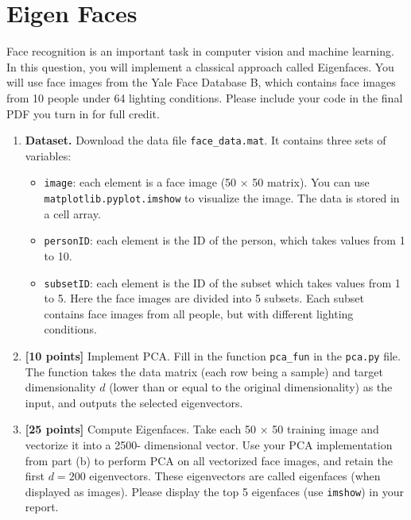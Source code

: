 \documentclass[a3paper,12pt]{extarticle} %
\begin{document}
\newpage
\section{Eigen Faces}
Face recognition is an important task in computer vision and machine learning. In this question, you will
implement a classical approach called Eigenfaces. You will use face images from the Yale Face Database
B, which contains face images from 10 people under 64 lighting conditions. Please include your code in
the final PDF you turn in for full credit.

\begin{enumerate}
    \item \textbf{Dataset.} Download the data file \texttt{face\_data.mat}. It contains three sets of variables:
    \begin{itemize}
        \item \texttt{image}: each element is a face image (50 × 50 matrix). You can use \texttt{matplotlib.pyplot.imshow}
        to visualize the image. The data is stored in a cell array.
        \item \texttt{personID}: each element is the ID of the person, which takes values from 1 to 10.
        \item \texttt{subsetID}: each element is the ID of the subset which takes values from 1 to 5. Here the face
        images are divided into 5 subsets. Each subset contains face images from all people, but with
        different lighting conditions.
    \end{itemize}
    
    \item \textbf{[10 points]} Implement PCA. Fill in the function \texttt{pca\_fun} in the \texttt{pca.py} file. The function takes the
    data matrix (each row being a sample) and target dimensionality $d$ (lower than or equal to the original
    dimensionality) as the input, and outputs the selected eigenvectors.
    
    \item \textbf{[25 points]} Compute Eigenfaces. Take each 50 × 50 training image and vectorize it into a 2500-
    dimensional vector. Use your PCA implementation from part (b) to perform PCA on all vectorized
    face images, and retain the first $d = 200$ eigenvectors. These eigenvectors are called eigenfaces (when
    displayed as images). Please display the top 5 eigenfaces (use \texttt{imshow}) in your report.
\end{enumerate}

\newpage 
\end{document}
